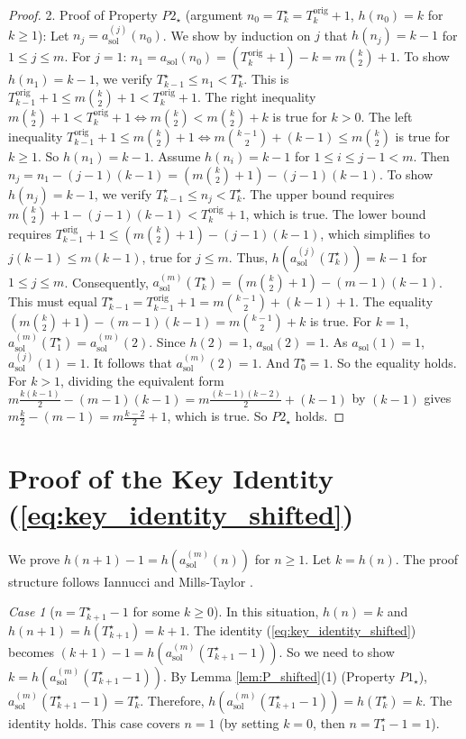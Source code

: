 \documentclass[11pt,a4paper]{article} %
\theoremstyle{remark}
\newtheorem{caseenv}{Case}[section] %
\begin{document}
\begin{proof}
2.  Proof of Property $P2_{\star}$ (argument $n_0 = T^{\star}_k = T_k^{\text{orig}}+1$, $h(n_0)=k$ for $k \ge 1$):
    Let $n_j = a_{\text{sol}}^{(j)}(n_0)$. We show by induction on $j$ that $h(n_j)=k-1$ for $1 \le j \le m$.
    For $j=1$: $n_1 = a_{\text{sol}}(n_0) = (T_k^{\text{orig}}+1)-k = m\binom{k}{2}+1$.
    To show $h(n_1)=k-1$, we verify $T^{\star}_{k-1} \le n_1 < T^{\star}_k$. This is $T_{k-1}^{\text{orig}}+1 \le m\binom{k}{2}+1 < T_k^{\text{orig}}+1$.
    The right inequality $m\binom{k}{2}+1 < T_k^{\text{orig}}+1 \iff m\binom{k}{2} < m\binom{k}{2}+k$ is true for $k>0$.
    The left inequality $T_{k-1}^{\text{orig}}+1 \le m\binom{k}{2}+1 \iff m\binom{k-1}{2}+(k-1) \le m\binom{k}{2}$ is true for $k \ge 1$. So $h(n_1)=k-1$.
    Assume $h(n_i)=k-1$ for $1 \le i \le j-1 < m$. Then $n_j = n_1-(j-1)(k-1) = (m\binom{k}{2}+1)-(j-1)(k-1)$.
    To show $h(n_j)=k-1$, we verify $T^{\star}_{k-1} \le n_j < T^{\star}_k$. The upper bound requires $m\binom{k}{2}+1-(j-1)(k-1) < T_k^{\text{orig}}+1$, which is true. The lower bound requires $T_{k-1}^{\text{orig}}+1 \le (m\binom{k}{2}+1)-(j-1)(k-1)$, which simplifies to $j(k-1) \le m(k-1)$, true for $j \le m$.
    Thus, $h(a_{\text{sol}}^{(j)}(T^{\star}_k))=k-1$ for $1 \le j \le m$.
    Consequently, $a_{\text{sol}}^{(m)}(T^{\star}_k) = (m\binom{k}{2}+1) - (m-1)(k-1)$.
    This must equal $T^{\star}_{k-1} = T_{k-1}^{\text{orig}}+1 = m\binom{k-1}{2}+(k-1)+1$.
    The equality $(m\binom{k}{2}+1) - (m-1)(k-1) = m\binom{k-1}{2}+k$ is true. For $k=1$, $a_{\text{sol}}^{(m)}(T_1^{\star})=a_{\text{sol}}^{(m)}(2)$. Since $h(2)=1$, $a_{\text{sol}}(2)=1$. As $a_{\text{sol}}(1)=1$, $a_{\text{sol}}^{(j)}(1)=1$. It follows that $a_{\text{sol}}^{(m)}(2)=1$. And $T_0^{\star}=1$. So the equality holds. For $k>1$, dividing the equivalent form $m\frac{k(k-1)}{2} - (m-1)(k-1) = m\frac{(k-1)(k-2)}{2} + (k-1)$ by $(k-1)$ gives $m\frac{k}{2} - (m-1) = m\frac{k-2}{2} + 1$, which is true. So $P2_{\star}$ holds.
\end{proof}

\section{Proof of the Key Identity (\ref{eq:key_identity_shifted})} \label{sec:proof_key_identity}
We prove $h(n+1)-1 = h(a_{\text{sol}}^{(m)}(n))$ for $n \ge 1$. Let $k=h(n)$. The proof structure follows Iannucci and Mills-Taylor \cite[Proof of Theorem 1]{Iannucci1999}.

\begin{caseenv}[$n = T^{\star}_{k+1}-1$ for some $k \ge 0$] \label{case:key_identity_boundary}
In this situation, $h(n)=k$ and $h(n+1)=h(T^{\star}_{k+1})=k+1$.
The identity (\ref{eq:key_identity_shifted}) becomes $(k+1)-1 = h(a_{\text{sol}}^{(m)}(T^{\star}_{k+1}-1))$.
So we need to show $k = h(a_{\text{sol}}^{(m)}(T^{\star}_{k+1}-1))$.
By Lemma \ref{lem:P_shifted}(1) (Property $P1_{\star}$), $a_{\text{sol}}^{(m)}(T^{\star}_{k+1}-1) = T^{\star}_k$.
Therefore, $h(a_{\text{sol}}^{(m)}(T^{\star}_{k+1}-1)) = h(T^{\star}_k) = k$.
The identity holds. This case covers $n=1$ (by setting $k=0$, then $n=T^{\star}_1-1=1$).
\end{caseenv}
\end{document}
